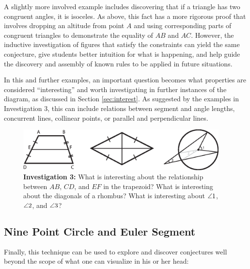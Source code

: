 A slightly more involved example includes discovering that if a
triangle has two congruent angles, it is isoceles.  As above, this
fact has a more rigorous proof that involves dropping an altitude from
point $A$ and using corresponding parts of congruent triangles to
demonstrate the equality of $AB$ and $AC$.  However, the inductive
investigation of figures that satisfy the constraints can yield the
same conjecture, give students better intuition for what is happening,
and help guide the discovery and assembly of known rules to be applied
in future situations.

In this and further examples, an important question becomes what
properties are considered ``interesting'' and worth investigating in
further instances of the diagram, as discussed in Section
\ref{sec:interest}.  As suggested by the examples in Investigation 3,
this can include relations between segment and angle lengths,
concurrent lines, collinear points, or parallel and perpendicular
lines.

\begin{figure}[h!]
\centering
\includegraphics[width=0.95\textwidth]{diagrams/extra-diagrams.eps}
\captionsetup{labelformat=empty}
\caption{{\bf Investigation 3:} What is interesting about the
  relationship between $AB$, $CD$, and $EF$ in the trapezoid? What is
  interesting about the diagonals of a rhombus? What is interesting
  about $\protect\angle 1$, $\protect\angle 2$, and $\protect\angle 3$?}
\end{figure}

\subsection{Nine Point Circle and Euler Segment}

Finally, this technique can be used to explore and discover
conjectures well beyond the scope of what one can visualize in his or
her head:

